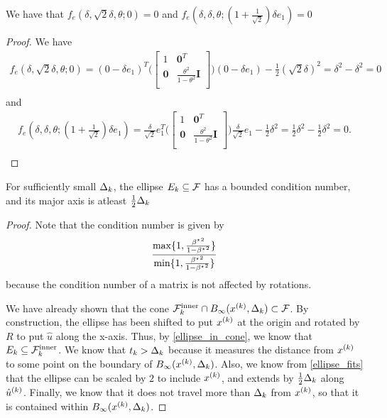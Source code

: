 \begin{theorem}
\label{ellipse_fits}
We have that $f_e(\delta, \sqrt{2}\delta, \theta; 0) = 0$ and $f_e(\delta, \delta, \theta; (1 + \frac{1}{\sqrt{2}}) \delta e_1) = 0$
\end{theorem}
\begin{proof}

We have
\begin{align*}
f_e(\delta, \sqrt{2}\delta, \theta; 0) =(0 - \delta e_1)^T\bigg(\begin{bmatrix}
1 & \boldsymbol0^T \\
\boldsymbol 0 & \frac{\theta^2}{1 - \theta^2} \boldsymbol I \\
\end{bmatrix}\bigg)(0 - \delta e_1) - \frac 1 2 (\sqrt 2 \delta)^2
=\delta^2 - \delta^2 = 0\\
\end{align*}
and
\begin{align*}
f_e(\delta, \delta, \theta; (1 + \frac{1}{\sqrt{2}}) \delta e_1) =\frac {\delta}{\sqrt{2}}e_1^T\bigg(\begin{bmatrix}
1 & \boldsymbol0^T \\
\boldsymbol 0 & \frac{\theta^2}{1 - \theta^2} \boldsymbol I \\
\end{bmatrix}\bigg)\frac {\delta}{\sqrt{2}}e_1 - \frac 1 2 \delta^2
=\frac 1 2 \delta^2 - \frac 1 2 \delta^2 = 0.\\
\end{align*}

\end{proof}

\begin{theorem}
For sufficiently small $\Delta_k$, the ellipse $E_k \subseteq {\mathcal F}$ has a bounded condition number, and its major axis is atleast $\frac 1 2 \Delta_k$
\end{theorem}

\begin{proof}
Note that the condition number is given by
\begin{align*}
\frac{\max\{1, \frac{{\beta^{\star}}^2}{1 - {\beta^{\star}}^2}\}}{\min\{1, \frac{{\beta^{\star}}^2}{1 - {\beta^{\star}}^2}\}}
\end{align*}
because the condition number of a matrix is not affected by rotations.

We have already shown that the cone ${\mathcal {F}^{\text{inner}}_k} \cap B_{\infty}({x^{(k)}}, \Delta_k) \subset {\mathcal F}$.
By construction, the ellipse has been shifted to put ${x^{(k)}}$ at the origin and rotated by $R$ to put $\hat u$ along the x-axis.
Thus, by \cref{ellipse_in_cone}, we know that $E_k \subseteq {\mathcal {F}^{\text{inner}}_k}$.
We know that $t_k > \Delta_k$ because it measures the distance from ${x^{(k)}}$ to some point on the boundary of $B_{\infty}({x^{(k)}}, \Delta_k)$.
Also, we know from \cref{ellipse_fits} that the ellipse can be scaled by $2$ to include ${x^{(k)}}$, and extends by $\frac 1 2 \Delta_k$ along ${{\hat u}^{(k)}}$.
Finally, we know that it does not travel more than $\Delta_k$ from ${x^{(k)}}$, so that it is contained within $B_{\infty}({x^{(k)}}, \Delta_k)$.
\end{proof}


